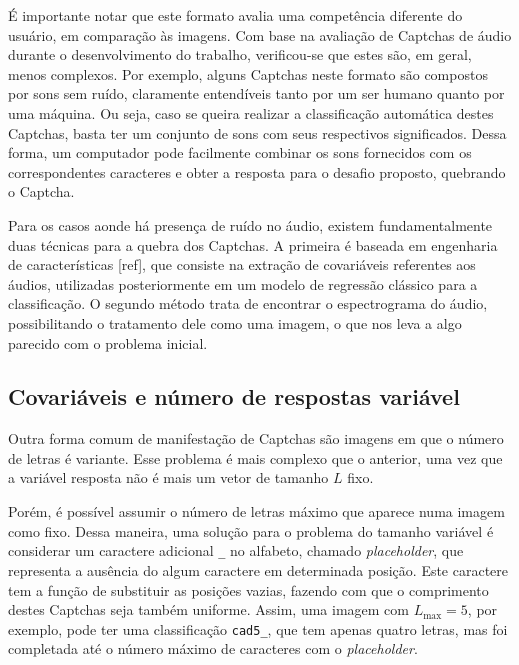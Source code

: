 \documentclass[12pt,]{report}
\begin{document}
É importante notar que este formato avalia uma competência diferente do usuário, em comparação às imagens. Com base na avaliação de Captchas de áudio durante o desenvolvimento do trabalho, verificou-se que estes são, em geral, menos complexos. Por exemplo, alguns Captchas neste formato são compostos por sons sem ruído, claramente entendíveis tanto por um ser humano quanto por uma máquina. Ou seja, caso se queira realizar a classificação automática destes Captchas, basta ter um conjunto de sons com seus respectivos significados. Dessa forma, um computador pode facilmente combinar os sons fornecidos com os correspondentes caracteres e obter a resposta para o desafio proposto, quebrando o Captcha.

Para os casos aonde há presença de ruído no áudio, existem fundamentalmente duas técnicas para a quebra dos Captchas. A primeira é baseada em engenharia de características {[}ref{]}, que consiste na extração de covariáveis referentes aos áudios, utilizadas posteriormente em um modelo de regressão clássico para a classificação. O segundo método trata de encontrar o espectrograma do áudio, possibilitando o tratamento dele como uma imagem, o que nos leva a algo parecido com o problema inicial.

\hypertarget{covariuxe1veis-e-nuxfamero-de-respostas-variuxe1vel}{%
\subsection{Covariáveis e número de respostas variável}\label{covariuxe1veis-e-nuxfamero-de-respostas-variuxe1vel}}

Outra forma comum de manifestação de Captchas são imagens em que o número de letras é variante. Esse problema é mais complexo que o anterior, uma vez que a variável resposta não é mais um vetor de tamanho \(L\) fixo.

Porém, é possível assumir o número de letras máximo que aparece numa imagem como fixo. Dessa maneira, uma solução para o problema do tamanho variável é considerar um caractere adicional \texttt{\_} no alfabeto, chamado \emph{placeholder}, que representa a ausência do algum caractere em determinada posição. Este caractere tem a função de substituir as posições vazias, fazendo com que o comprimento destes Captchas seja também uniforme. Assim, uma imagem com \(L_{\max} = 5\), por exemplo, pode ter uma classificação \texttt{cad5\_}, que tem apenas quatro letras, mas foi completada até o número máximo de caracteres com o \emph{placeholder}.
\end{document}
